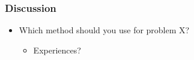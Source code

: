 \documentclass{beamer}
\begin{document}
\begin{frame}
  \frametitle{Discussion}

  \begin{itemize}
  \item Which method should you use for problem X?
    \begin{itemize}
    \item Experiences?
    \end{itemize}
  \end{itemize}
\end{frame}
\end{document}
